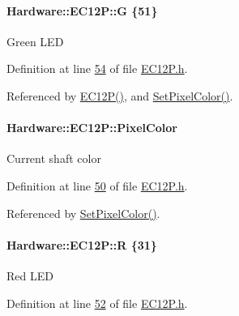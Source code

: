 \paragraph[{G}]{ Hardware\+::\+E\+C12\+P\+::\+G \{51\}\hspace{0.3cm}{\ttfamily [private]}}\label{class_hardware_1_1_e_c12_p_a7afd63c14e12d861c8b20614ef34d70e}
Green L\+E\+D 

Definition at line \hyperlink{_e_c12_p_8h_source_l00054}{54} of file \hyperlink{_e_c12_p_8h_source}{E\+C12\+P.\+h}.



Referenced by \hyperlink{_e_c12_p_8cpp_source_l00012}{E\+C12\+P()}, and \hyperlink{_e_c12_p_8cpp_source_l00035}{Set\+Pixel\+Color()}.

\hypertarget{class_hardware_1_1_e_c12_p_a1bc6223c152c6d9f30304b92069f05c0}{}
\paragraph[{Pixel\+Color}]{ Hardware\+::\+E\+C12\+P\+::\+Pixel\+Color\hspace{0.3cm}{\ttfamily [private]}}\label{class_hardware_1_1_e_c12_p_a1bc6223c152c6d9f30304b92069f05c0}
Current shaft color 

Definition at line \hyperlink{_e_c12_p_8h_source_l00050}{50} of file \hyperlink{_e_c12_p_8h_source}{E\+C12\+P.\+h}.



Referenced by \hyperlink{_e_c12_p_8cpp_source_l00035}{Set\+Pixel\+Color()}.

\hypertarget{class_hardware_1_1_e_c12_p_a0a4f03a37d709349994e800e44f5c781}{}
\paragraph[{R}]{ Hardware\+::\+E\+C12\+P\+::\+R \{31\}\hspace{0.3cm}{\ttfamily [private]}}\label{class_hardware_1_1_e_c12_p_a0a4f03a37d709349994e800e44f5c781}
Red L\+E\+D 

Definition at line \hyperlink{_e_c12_p_8h_source_l00052}{52} of file \hyperlink{_e_c12_p_8h_source}{E\+C12\+P.\+h}.



